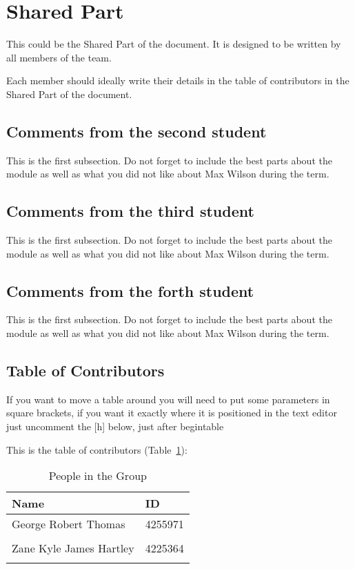 \section{Shared Part}

This could be the Shared Part of the document. It is designed to be written by all members of the team.

Each member should ideally write their details in the table of contributors in the Shared Part of the document.



\subsection{Comments from the second student}
This is the first subsection. Do not forget to include the best parts about the module as well as what you did not like about Max Wilson during the term.

\subsection{Comments from the third student}
This is the first subsection. Do not forget to include the best parts about the module as well as what you did not like about Max Wilson during the term.

\subsection{Comments from the forth student}
This is the first subsection. Do not forget to include the best parts about the module as well as what you did not like about Max Wilson during the term.

\subsection{Table of Contributors}


If you want to move a table around you will need to put some parameters in square brackets, if you want it exactly where it is positioned in the text editor just uncomment the [h] below, just after begin{table}

This is the table of contributors (Table~\ref{authors}):
\begin{table}%
\centering
\caption{People in the Group}
\label{authors}
\begin{tabular}{|l|l|}
\hline
\textbf{Name} & \textbf{ID} \\
\hline
George Robert Thomas & 4255971\\
\hline
& \\
\hline
Zane Kyle James Hartley & 4225364 \\
\hline
& \\
\hline
\end{tabular}
\end{table}